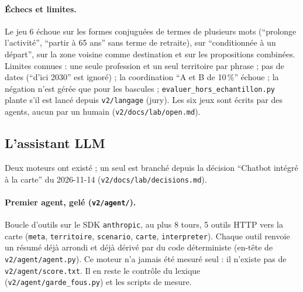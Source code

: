 \paragraph{Échecs et limites.}
Le jeu 6 échoue sur les formes conjuguées de termes de plusieurs mots (\enquote{prolonge l'activité}, \enquote{partir à 65 ans} sans terme de retraite), sur \enquote{conditionnée à un départ}, sur la zone voisine comme destination et sur les propositions combinées.
Limites connues : une seule profession et un seul territoire par phrase ; pas de dates (\enquote{d'ici 2030} est ignoré) ; la coordination \enquote{A et B de 10\,\%} échoue ; la négation n'est gérée que pour les bascules ; \texttt{evaluer\_\allowbreak{}hors\_\allowbreak{}echantillon.py} plante s'il est lancé depuis \texttt{v2/\allowbreak{}langage} (jury).
Les six jeux sont écrits par des agents, aucun par un humain (\texttt{v2/\allowbreak{}docs/\allowbreak{}lab/\allowbreak{}open.md}).

\subsection{L'assistant LLM}\label{pro:assistant}

Deux moteurs ont existé ; un seul est branché depuis la décision \enquote{Chatbot intégré à la carte} du 2026-11-14 (\texttt{v2/\allowbreak{}docs/\allowbreak{}lab/\allowbreak{}decisions.md}).

\paragraph{Premier agent, gelé (\texttt{v2/\allowbreak{}agent/\allowbreak{}}).}
Boucle d'outils sur le SDK \texttt{anthropic}, au plus 8\mesure{} tours, 5\mesure{} outils HTTP vers la carte (\texttt{meta}, \texttt{territoire}, \texttt{scenario}, \texttt{carte}, \texttt{interpreter}). Chaque outil renvoie un résumé déjà arrondi et déjà dérivé par du code déterministe (en-tête de \texttt{v2/\allowbreak{}agent/\allowbreak{}agent.py}).
Ce moteur n'a jamais été mesuré seul : il n'existe pas de \texttt{v2/\allowbreak{}agent/\allowbreak{}score.txt}. Il en reste le contrôle du lexique (\texttt{v2/\allowbreak{}agent/\allowbreak{}garde\_\allowbreak{}fous.py}) et les scripts de mesure.


